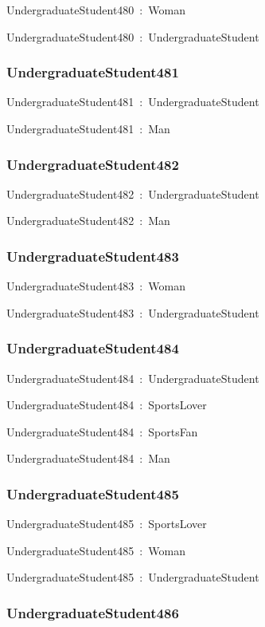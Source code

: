 \documentclass{article}
\begin{document}
UndergraduateStudent480~:~Woman

UndergraduateStudent480~:~UndergraduateStudent

\subsubsection*{UndergraduateStudent481}

UndergraduateStudent481~:~UndergraduateStudent

UndergraduateStudent481~:~Man

\subsubsection*{UndergraduateStudent482}

UndergraduateStudent482~:~UndergraduateStudent

UndergraduateStudent482~:~Man

\subsubsection*{UndergraduateStudent483}

UndergraduateStudent483~:~Woman

UndergraduateStudent483~:~UndergraduateStudent

\subsubsection*{UndergraduateStudent484}

UndergraduateStudent484~:~UndergraduateStudent

UndergraduateStudent484~:~SportsLover

UndergraduateStudent484~:~SportsFan

UndergraduateStudent484~:~Man

\subsubsection*{UndergraduateStudent485}

UndergraduateStudent485~:~SportsLover

UndergraduateStudent485~:~Woman

UndergraduateStudent485~:~UndergraduateStudent

\subsubsection*{UndergraduateStudent486}
\end{document}
